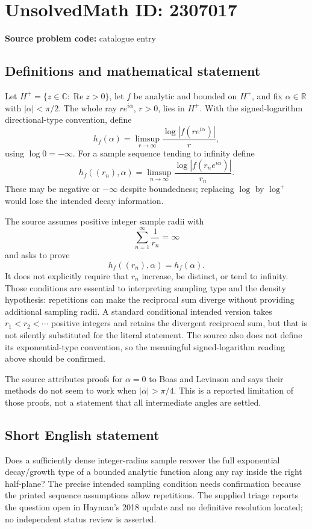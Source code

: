 \documentclass[11pt]{article}
\newcommand{\R}{\mathbb{R}}
\newcommand{\C}{\mathbb{C}}
\begin{document}
\section*{UnsolvedMath ID: 2307017}
\textbf{Source problem code:} catalogue entry
\subsection{Definitions and mathematical statement}
Let $H^+=\{z\in\C:\operatorname{Re}z>0\}$, let $f$ be analytic and bounded on $H^+$, and fix $\alpha\in\R$ with $|\alpha|<\pi/2$. The whole ray $re^{i\alpha}$, $r>0$, lies in $H^+$. With the signed-logarithm directional-type convention, define
\[
 h_f(\alpha)=\limsup_{r\to\infty}\frac{\log|f(re^{i\alpha})|}{r},
\]
using $\log0=-\infty$. For a sample sequence tending to infinity define
\[
 h_f((r_n),\alpha)=\limsup_{n\to\infty}
                   \frac{\log|f(r_ne^{i\alpha})|}{r_n}.
\]
These may be negative or $-\infty$ despite boundedness; replacing $\log$ by $\log^+$ would lose the intended decay information.

The source assumes positive integer sample radii with
\[
 \sum_{n=1}^{\infty}\frac1{r_n}=\infty
\]
and asks to prove
\[
 h_f((r_n),\alpha)=h_f(\alpha).
\]
It does not explicitly require that $r_n$ increase, be distinct, or tend to infinity. Those conditions are essential to interpreting sampling type and the density hypothesis: repetitions can make the reciprocal sum diverge without providing additional sampling radii. A standard conditional intended version takes $r_1<r_2<\cdots$ positive integers and retains the divergent reciprocal sum, but that is not silently substituted for the literal statement. The source also does not define its exponential-type convention, so the meaningful signed-logarithm reading above should be confirmed.

The source attributes proofs for $\alpha=0$ to Boas and Levinson and says their methods do not seem to work when $|\alpha|>\pi/4$. This is a reported limitation of those proofs, not a statement that all intermediate angles are settled.
\subsection{Short English statement}
Does a sufficiently dense integer-radius sample recover the full exponential decay/growth type of a bounded analytic function along any ray inside the right half-plane? The precise intended sampling condition needs confirmation because the printed sequence assumptions allow repetitions. The supplied triage reports the question open in Hayman's 2018 update and no definitive resolution located; no independent status review is asserted.
\end{document}
